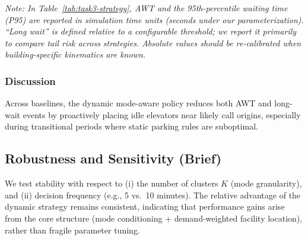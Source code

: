 \vspace{-0.5em}

\noindent\textit{Note: In Table~\ref{tab:task3-strategy}, AWT and the 95th-percentile waiting time (P95) are reported in simulation time units (seconds under our parameterization). ``Long wait'' is defined relative to a configurable threshold; we report it primarily to compare tail risk across strategies. Absolute values should be re-calibrated when building-specific kinematics are known\cite{cibse2020guided,barney2015elevatortraffic}.}

\subsubsection{Discussion}
Across baselines, the dynamic mode-aware policy reduces both AWT and long-wait events by proactively placing idle elevators near likely call origins, especially during transitional periods where static parking rules are suboptimal.

\subsection{Robustness and Sensitivity (Brief)}
We test stability with respect to (i) the number of clusters $K$ (mode granularity), and (ii) decision frequency (e.g., 5 vs.\ 10 minutes). The relative advantage of the dynamic strategy remains consistent, indicating that performance gains arise from the core structure (mode conditioning + demand-weighted facility location), rather than fragile parameter tuning.
